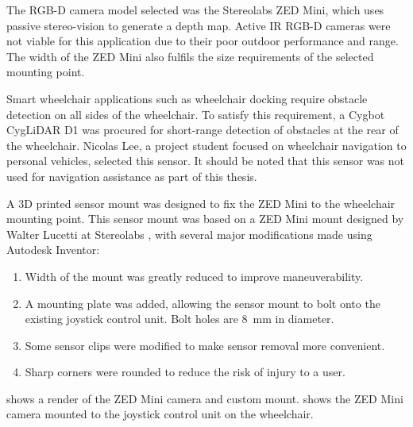 The RGB-D camera model selected was the Stereolabs ZED Mini, which uses passive stereo-vision
to generate a depth map. Active IR RGB-D cameras were not viable for this application
due to their poor outdoor performance and range. The width of the ZED Mini also fulfils the
size requirements of the selected mounting point.

Smart wheelchair applications such as wheelchair docking require
obstacle detection on all sides of the wheelchair. To satisfy this requirement, a
Cygbot CygLiDAR D1 was procured for short-range detection of obstacles at the rear of the
wheelchair. Nicolas Lee, a project student focused on
wheelchair navigation to personal vehicles, selected this sensor. It should be noted that
this sensor was not used for navigation assistance as part of this thesis.

A 3D printed sensor mount was designed to fix the ZED Mini to the wheelchair mounting point.
This sensor mount was based on a ZED Mini mount designed by Walter Lucetti at Stereolabs \cite{lucettiStereolabsZEDMini2018},
with several major modifications made using Autodesk Inventor:
\begin{enumerate}[topsep=0pt,itemsep=-1ex,partopsep=1ex,parsep=1ex]
    \item Width of the mount was greatly reduced to improve maneuverability.
    \item A mounting plate was added, allowing the sensor mount to bolt onto
            the existing joystick control unit. Bolt holes are \SI{8}{\milli\metre} in diameter.
    \item Some sensor clips were modified to make sensor removal more convenient.
    \item Sharp corners were rounded to reduce the risk of injury to a user.
\end{enumerate}
 shows a render of the ZED Mini camera and custom mount.
 shows the ZED Mini camera mounted to the joystick control unit
on the wheelchair.


